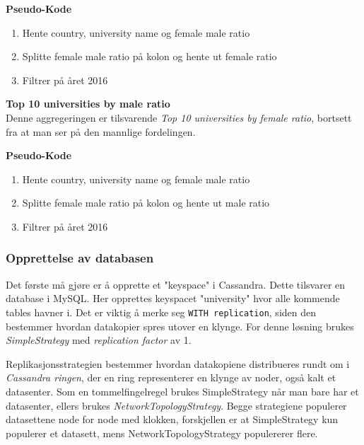 \textbf{Pseudo-Kode}
\begin{enumerate}
  \item Hente country, university name og female male ratio
  \item Splitte female male ratio på kolon og hente ut female ratio
  \item Filtrer på året 2016
\end{enumerate}

\pagebreak
\textbf{Top 10 universities by male ratio}\\
Denne aggregeringen er tilsvarende \textit{Top 10 universities by female ratio}, bortsett fra at man ser på den mannlige fordelingen.

\textbf{Pseudo-Kode}
\begin{enumerate}
  \item Hente country, university name og female male ratio
  \item Splitte female male ratio på kolon og hente ut male ratio
  \item Filtrer på året 2016
\end{enumerate}

\pagebreak
\subsubsection{Opprettelse av databasen}
Det første må gjøre er å opprette et "keyspace" i Cassandra. Dette tilsvarer en database i MySQL. Her opprettes keyspacet "university" hvor alle kommende tables havner i. Det er viktig å merke seg \lstinline{WITH replication}, siden den bestemmer hvordan datakopier spres utover en klynge. For denne løsning brukes \textit{SimpleStrategy} med \textit{replication factor} av 1.


Replikasjonsstrategien bestemmer hvordan datakopiene distribueres rundt om i \textit{Cassandra ringen}, der en ring representerer en klynge av noder, også kalt et datasenter. Som en tommelfingelregel brukes SimpleStrategy når man bare har et datasenter, ellers brukes \textit{NetworkTopologyStrategy}. Begge strategiene populerer datasettene node for node med klokken, forskjellen er at SimpleStrategy kun populerer et datasett, mens NetworkTopologyStrategy populererer flere.

